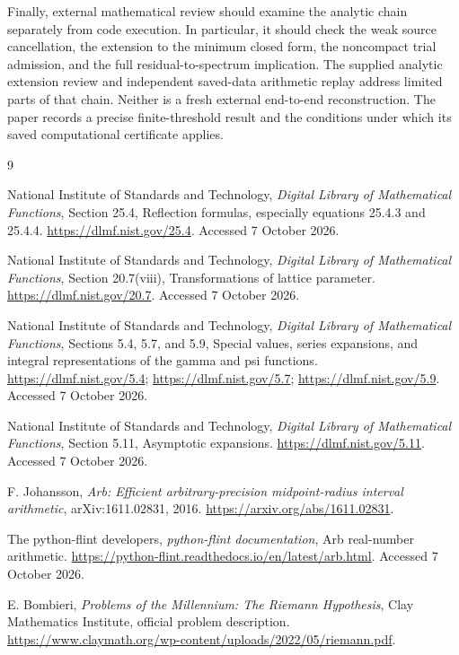 \documentclass[11pt,a4paper]{article}
\numberwithin{equation}{section}
\theoremstyle{definition}\newtheorem{definition}[theorem]{Definition}
\theoremstyle{remark}\newtheorem{remark}[theorem]{Remark}
\begin{document}
Finally, external mathematical review should examine the analytic chain separately from code execution. In particular, it should check the weak source cancellation, the extension to the minimum closed form, the noncompact trial admission, and the full residual-to-spectrum implication. The supplied analytic extension review and independent saved-data arithmetic replay address limited parts of that chain. Neither is a fresh external end-to-end reconstruction. The paper records a precise finite-threshold result and the conditions under which its saved computational certificate applies.

\begin{thebibliography}{9}
\raggedright
{}
National Institute of Standards and Technology,
\emph{Digital Library of Mathematical Functions}, Section 25.4,
Reflection formulas, especially equations 25.4.3 and 25.4.4.
\url{https://dlmf.nist.gov/25.4}. Accessed 7 October 2026.

National Institute of Standards and Technology,
\emph{Digital Library of Mathematical Functions}, Section 20.7(viii),
Transformations of lattice parameter.
\url{https://dlmf.nist.gov/20.7}. Accessed 7 October 2026.

National Institute of Standards and Technology,
\emph{Digital Library of Mathematical Functions}, Sections 5.4, 5.7, and 5.9,
Special values, series expansions, and integral representations of the gamma and psi functions.
\url{https://dlmf.nist.gov/5.4};
\url{https://dlmf.nist.gov/5.7};
\url{https://dlmf.nist.gov/5.9}. Accessed 7 October 2026.

National Institute of Standards and Technology,
\emph{Digital Library of Mathematical Functions}, Section 5.11,
Asymptotic expansions.
\url{https://dlmf.nist.gov/5.11}. Accessed 7 October 2026.

F. Johansson,
\emph{Arb: Efficient arbitrary-precision midpoint-radius interval arithmetic},
arXiv:1611.02831, 2016.
\url{https://arxiv.org/abs/1611.02831}.

The python-flint developers,
\emph{python-flint documentation}, Arb real-number arithmetic.
\url{https://python-flint.readthedocs.io/en/latest/arb.html}.
Accessed 7 October 2026.

E. Bombieri,
\emph{Problems of the Millennium: The Riemann Hypothesis},
Clay Mathematics Institute, official problem description.
\url{https://www.claymath.org/wp-content/uploads/2022/05/riemann.pdf}.
\end{thebibliography}
\end{document}
